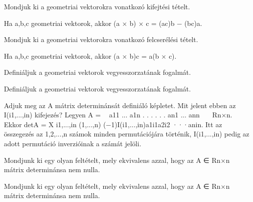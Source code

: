 \begin{frame}
  \begin{tcolorbox}[title={20}]
    Mondjuk ki a geometriai vektorokra vonatkozó kifejtési tételt.

  \tcblower
Ha a,b,c geometriai vektorok, akkor (a × b) × c = (ac)b − (bc)a.

  \end{tcolorbox}
\end{frame}


\begin{frame}
  \begin{tcolorbox}[title={21}]
    Mondjuk ki a geometriai vektorokra vonatkozó felcserélési tételt.

  \tcblower
    Ha a,b,c geometriai vektorok, akkor (a × b)c = a(b × c). 
  \end{tcolorbox}
\end{frame}


\begin{frame}
  \begin{tcolorbox}[title={22}]
    Deﬁniáljuk a geometriai vektorok vegyesszorzatának fogalmát.

  \tcblower
 Deﬁniáljuk a geometriai vektorok vegyesszorzatának fogalmát.

  \end{tcolorbox}
\end{frame}


\begin{frame}
  \begin{tcolorbox}[title={23}]
   Adjuk meg az A mátrix determinánsát deﬁniáló képletet. Mit jelent ebben az I(i1,...,in) kifejezés? 
  \tcblower
Legyen A = 
a11 ... a1n . . . . . . an1 ... ann
 ∈ Rn×n. Ekkor detA = X i1,...,in (1,...,n)
(−1)I(i1,...,in)a1i1a2i2 ···anin.
Itt az összegezés az {1,2,...,n} számok minden permutációjára történik, I(i1,...,in) pedig az adott permutáció inverzióinak a számát jelöli.

  \end{tcolorbox}
\end{frame}


\begin{frame}
  \begin{tcolorbox}[title={24}]
   Mondjunk ki egy olyan feltételt, mely ekvivalens azzal, hogy az A ∈ Rn×n mátrix determinánsa nem nulla.

  \tcblower
Mondjunk ki egy olyan feltételt, mely ekvivalens azzal, hogy az A ∈ Rn×n mátrix determinánsa nem nulla.

  \end{tcolorbox}
\end{frame}


